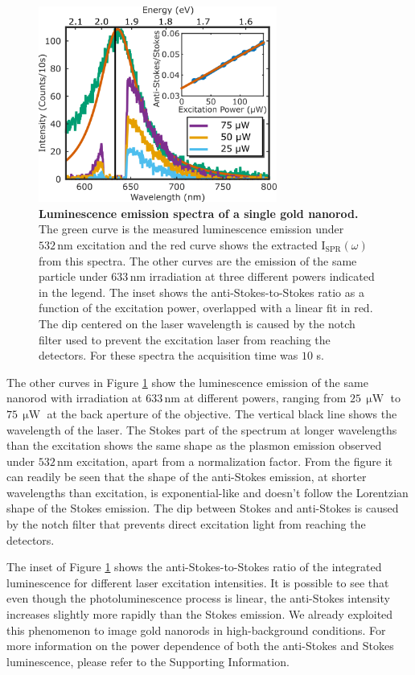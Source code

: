 \documentclass[journal=nalefd,manuscript=letter]{achemso}
\newcommand{\HI}[1]{{#1}} %
\newcommand{\nm}{\ensuremath{\,\textrm{nm}}}
\newcommand{\uW}{\ensuremath{\,\upmu\textrm{W}}}
\begin{document}
\begin{figure}[tp] \centering
\includegraphics[width=78.4mm]{Figures/02_Several_Intensities/02_several_intensities.png}
\caption{\textbf{Luminescence emission spectra of a single gold nanorod.} The green curve is the
measured luminescence emission under $532\nm$ excitation \HI{and the red curve shows the 
extracted $\textrm{I}_{\textrm{SPR}}(\omega)$ from this spectra.}
The other curves are the emission of the same particle under $633\nm$ irradiation at three 
different powers indicated in the legend. The inset shows the anti-Stokes-to-Stokes ratio as a function
of the excitation power, overlapped with a linear fit in red. The dip centered on the laser wavelength
is caused by the notch filter used to prevent the excitation laser from reaching the detectors. For 
these spectra the acquisition time was $10$ s. }
	\label{fig:spectra_intensity}
\end{figure}

The other curves in Figure \ref{fig:spectra_intensity} show the luminescence emission of
the same nanorod with irradiation at $633\nm$ at different powers,
ranging from $25\uW$ to $75\uW$ at the back aperture of the objective.  
The vertical black line shows the wavelength of the laser. The Stokes part of the
spectrum at longer wavelengths than the excitation shows the same shape as the
plasmon emission observed under $532\nm$ excitation, apart from a normalization
factor. From the figure it can readily be seen that the shape of the anti-Stokes
emission, at shorter wavelengths than excitation, is exponential-like and
doesn't follow the Lorentzian shape of the Stokes emission. The dip between
Stokes and anti-Stokes is caused by the notch filter that prevents direct
excitation light from reaching the detectors. 

The inset of Figure \ref{fig:spectra_intensity} shows the anti-Stokes-to-Stokes ratio of
the integrated luminescence for different laser excitation intensities. \HI{It is
possible to see that even though the photoluminescence process is linear, 
the anti-Stokes intensity increases slightly more rapidly than the Stokes emission.}
We already exploited this phenomenon to image gold nanorods in high-background
conditions\cite{Carattino2016a}. 
For more information on the power dependence of both the anti-Stokes and Stokes luminescence, 
please refer to the Supporting Information. 
\end{document}
